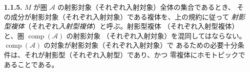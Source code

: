 \medskip\noindent\textbf{1.1.5.}\quad
$M$ が圏 $\mathcal A$ の射影対象（それぞれ入射対象）全体の集合であるとき、
その成分が射影対象（それぞれ入射対象）である複体を、上の規約に従って
\emph{射影型複体}（それぞれ\emph{入射型複体}）と呼ぶ。射影型複体
（それぞれ入射型複体）と、圏 $\operatorname{comp}(\mathcal A)$ の射影対象
（それぞれ入射対象）を混同してはならない。
$\operatorname{comp}(\mathcal A)$ の対象が射影対象（それぞれ入射対象）で
あるための必要十分条件は、それが射影型（それぞれ入射型）であり、かつ
零複体にホモトピックであることである。
\endgroup
